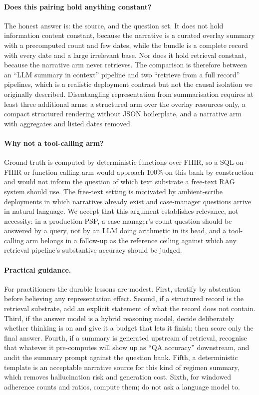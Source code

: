 \paragraph{Does this pairing hold anything constant?}
The honest answer is: the source, and the question set.  It does not hold information
content constant, because the narrative is a curated overlay summary with a precomputed
count and few dates, while the bundle is a complete record with every date and a large
irrelevant base.  Nor does it hold retrieval constant, because the narrative arm never
retrieves.  The comparison is therefore between an ``LLM summary in context'' pipeline and
two ``retrieve from a full record'' pipelines, which is a realistic deployment contrast
but not the causal isolation we originally described.  Disentangling representation from
summarisation requires at least three additional arms: a structured arm over the overlay
resources only, a compact structured rendering without JSON boilerplate, and a narrative
arm with aggregates and listed dates removed.

\paragraph{Why not a tool-calling arm?}
Ground truth is computed by deterministic functions over FHIR, so a SQL-on-FHIR or
function-calling arm would approach 100\% on this bank by construction and would not
inform the question of which text substrate a free-text RAG system should use.  The
free-text setting is motivated by ambient-scribe deployments in which narratives already
exist and case-manager questions arrive in natural language.  We accept that this
argument establishes relevance, not necessity: in a production PSP, a case manager's
count question should be answered by a query, not by an LLM doing arithmetic in its head,
and a tool-calling arm belongs in a follow-up as the reference ceiling against which any
retrieval pipeline's substantive accuracy should be judged.

\paragraph{Practical guidance.}
For practitioners the durable lessons are modest.  First, stratify by abstention before
believing any representation effect.  Second, if a structured record is the retrieval
substrate, add an explicit statement of what the record does not contain.  Third, if the
answer model is a hybrid reasoning model, decide deliberately whether thinking is on and
give it a budget that lets it finish; then score only the final answer.  Fourth, if a
summary is generated upstream of retrieval, recognise that whatever it pre-computes will
show up as ``QA accuracy'' downstream, and audit the summary prompt against the question
bank.  Fifth, a deterministic template is an acceptable narrative source for this kind of
regimen summary, which removes hallucination risk and generation cost.  Sixth, for
windowed adherence counts and ratios, compute them; do not ask a language model to.
